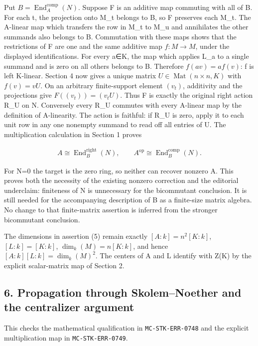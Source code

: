 Put \(B=\operatorname{End}_{A}^{\mathrm{comp}}(N)\). Suppose F is an additive map commuting with all of B. For each t, the projection onto M\_t belongs to B, so F preserves each M\_t. The A-linear map which transfers the row in M\_t to M\_u and annihilates the other summands also belongs to B. Commutation with these maps shows that the restrictions of F are one and the same additive map \(f:M\to M\), under the displayed identifications. For every a∈K, the map which applies L\_a to a single summand and is zero on all others belongs to B. Therefore \(f(av)=a f(v)\): f is left K-linear. Section 4 now gives a unique matrix \(U\in \operatorname{Mat}(n\times n,K)\) with \(f(v)=vU\). On an arbitrary finite-support element \((v_{t})\), additivity and the projections give \(F((v_{t}))=(v_{t} U)\). Thus F is exactly the original right action R\_U on N. Conversely every R\_U commutes with every A-linear map by the definition of A-linearity. The action is faithful: if R\_U is zero, apply it to each unit row in any one nonempty summand to read off all entries of U. The multiplication calculation in Section 1 proves

\[\begin{gathered}
A \cong \operatorname{End}_{B}^{\mathrm{right}}(N),\qquad A^{\mathrm{op}} \cong \operatorname{End}_{B}^{\mathrm{comp}}(N).
\end{gathered}\]

For N=0 the target is the zero ring, so neither can recover nonzero A. This proves both the necessity of the existing nonzero correction and the editorial underclaim: finiteness of N is unnecessary for the bicommutant conclusion. It is still needed for the accompanying description of B as a finite-size matrix algebra. No change to that finite-matrix assertion is inferred from the stronger bicommutant conclusion.

The dimensions in assertion (5) remain exactly \([A:k]=n^{2}[K:k]\), \([L:k]=[K:k]\), \(\operatorname{dim}_{k}(M)=n[K:k]\), and hence \([A:k][L:k]=\operatorname{dim}_{k}(M)^{2}\). The centers of A and L identify with Z(K) by the explicit scalar-matrix map of Section 2.

\subsection{6. Propagation through Skolem--Noether and the centralizer argument}\label{propagation-through-skolemnoether-and-the-centralizer-argument}

This checks the mathematical qualification in \texttt{MC-STK-ERR-0748} and the explicit multiplication map in \texttt{MC-STK-ERR-0749}.

